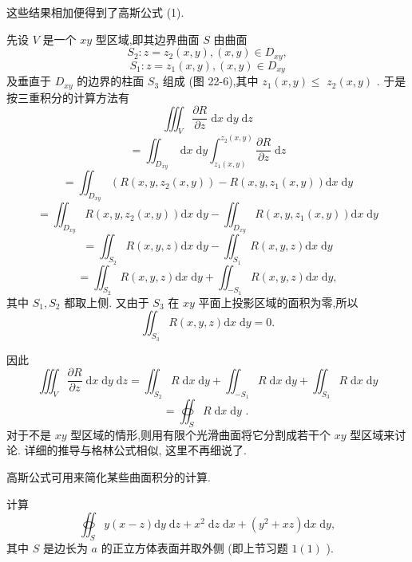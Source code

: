 这些结果相加便得到了高斯公式 (1).

先设 \(V\) 是一个 \({xy}\) 型区域,即其边界曲面 \(S\) 由曲面
\[
{S}_{2} : z = {z}_{2}\left( {x,y}\right) ,\left( {x,y}\right)  \in  {D}_{xy},
\]
\[
{S}_{1} : z = {z}_{1}\left( {x,y}\right) ,\left( {x,y}\right)  \in  {D}_{xy}
\]
及垂直于 \({D}_{xy}\) 的边界的柱面 \({S}_{3}\) 组成 (图 22-6),其中 \({z}_{1}\left( {x,y}\right)  \leq\)  \({z}_{2}\left( {x,y}\right)\) . 于是按三重积分的计算方法有
\[
{\iiint }_{V}\frac{\partial R}{\partial z}\mathrm{\;d}x\mathrm{\;d}y\mathrm{\;d}z
\]
\[
= {\iint }_{{D}_{xy}}\mathrm{\;d}x\mathrm{\;d}y{\int }_{{z}_{1}\left( {x,y}\right) }^{{z}_{2}\left( {x,y}\right) }\frac{\partial R}{\partial z}\mathrm{\;d}z
\]
\[
= {\iint }_{{D}_{xy}}\left( {R\left( {x,y,{z}_{2}\left( {x,y}\right) }\right)  - R\left( {x,y,{z}_{1}\left( {x,y}\right) }\right) \mathrm{d}x\mathrm{\;d}y}\right.
\]
\[
= {\iint }_{{D}_{xy}}R\left( {x,y,{z}_{2}\left( {x,y}\right) }\right) \mathrm{d}x\mathrm{\;d}y - {\iint }_{{D}_{xy}}R\left( {x,y,{z}_{1}\left( {x,y}\right) }\right) \mathrm{d}x\mathrm{\;d}y
\]
\[
= {\iint }_{{S}_{2}}R\left( {x,y,z}\right) \mathrm{d}x\mathrm{\;d}y - {\iint }_{{S}_{1}}R\left( {x,y,z}\right) \mathrm{d}x\mathrm{\;d}y
\]
\[
= {\iint }_{{S}_{2}}R\left( {x,y,z}\right) \mathrm{d}x\mathrm{\;d}y + {\iint }_{-{S}_{1}}R\left( {x,y,z}\right) \mathrm{d}x\mathrm{\;d}y,
\]
其中 \({S}_{1},{S}_{2}\) 都取上侧. 又由于 \({S}_{3}\) 在 \({xy}\) 平面上投影区域的面积为零,所以
\[
{\iint }_{{S}_{3}}R\left( {x,y,z}\right) \mathrm{d}x\mathrm{\;d}y = 0.
\]


因此
\[
{\iiint }_{V}\frac{\partial R}{\partial z}\mathrm{\;d}x\mathrm{\;d}y\mathrm{\;d}z = {\iint }_{{S}_{2}}R\mathrm{\;d}x\mathrm{\;d}y + {\iint }_{-{S}_{1}}R\mathrm{\;d}x\mathrm{\;d}y + {\iint }_{{S}_{3}}R\mathrm{\;d}x\mathrm{\;d}y
\]
\[
= {\oiint }_{S}R\mathrm{\;d}x\mathrm{\;d}y\text{ . }
\]
对于不是 \({xy}\) 型区域的情形,则用有限个光滑曲面将它分割成若干个 \({xy}\) 型区域来讨论. 详细的推导与格林公式相似, 这里不再细说了.

高斯公式可用来简化某些曲面积分的计算.

\begin{example}

\end{example}
计算
\[
{\oiint }_{S}y\left( {x - z}\right) \mathrm{d}y\mathrm{\;d}z + {x}^{2}\mathrm{\;d}z\mathrm{\;d}x + \left( {{y}^{2} + {xz}}\right) \mathrm{d}x\mathrm{\;d}y,
\]
其中 \(S\) 是边长为 \(a\) 的正立方体表面并取外侧 (即上节习题 \(1\left( 1\right)\) ).

